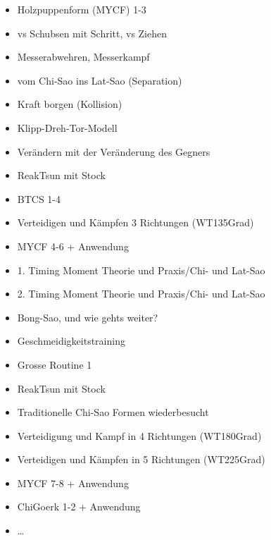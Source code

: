 \begin{WTGradTG}{3}

\begin{itemize}
	\item Holzpuppenform (MYCF) 1-3
	\item vs Schubsen mit Schritt, vs Ziehen
	\item Messerabwehren, Messerkampf
	\item vom Chi-Sao ins Lat-Sao (Separation)
	\item Kraft borgen (Kollision)
	\item Klipp-Dreh-Tor-Modell
	\item Ver\"andern mit der Ver\"anderung des Gegners
	\item ReakTsun mit Stock
	\item BTCS 1-4
	\item Verteidigen und K\"ampfen 3 Richtungen (WT135Grad)
\end{itemize}
	
\end{WTGradTG}

\begin{WTGradTG}{4}

\begin{itemize}
	\item MYCF 4-6 + Anwendung
	\item 1. Timing Moment Theorie und Praxis/Chi- und Lat-Sao
	\item 2. Timing Moment Theorie und Praxis/Chi- und Lat-Sao
	\item Bong-Sao, und wie gehts weiter?
	\item Geschmeidigkeitstraining
	\item Grosse Routine 1
	\item ReakTsun mit Stock
	\item Traditionelle Chi-Sao Formen wiederbesucht
	\item Verteidigung und Kampf in 4 Richtungen (WT180Grad)
\end{itemize}
	
\end{WTGradTG}

\begin{WTGradTG}{5}

\begin{itemize}
	\item Verteidigen und K\"ampfen in 5 Richtungen (WT225Grad)
	\item MYCF 7-8 + Anwendung
	\item ChiGoerk 1-2 + Anwendung
	\item \ldots
\end{itemize}

\end{WTGradTG}

